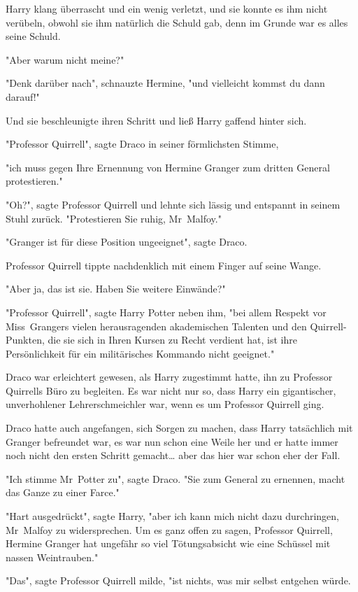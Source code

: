 {Harry klang überrascht und ein wenig verletzt, und sie konnte es ihm nicht verübeln, obwohl sie ihm natürlich die Schuld gab, denn im Grunde war es alles seine Schuld.

"Aber warum nicht meine?"

"Denk darüber nach", schnauzte Hermine, "und vielleicht kommst du dann darauf!"

Und sie beschleunigte ihren Schritt und ließ Harry gaffend hinter sich.

"Professor Quirrell", sagte Draco in seiner förmlichsten Stimme,

"ich muss gegen Ihre Ernennung von Hermine Granger zum dritten General protestieren."

"Oh?", sagte Professor Quirrell und lehnte sich lässig und entspannt in seinem Stuhl zurück. "Protestieren Sie ruhig, Mr~Malfoy."

"Granger ist für diese Position ungeeignet", sagte Draco.

Professor Quirrell tippte nachdenklich mit einem Finger auf seine Wange.

"Aber ja, das ist sie. Haben Sie weitere Einwände?"

"Professor Quirrell", sagte Harry Potter neben ihm, "bei allem Respekt vor Miss~Grangers vielen herausragenden akademischen Talenten und den Quirrell-Punkten, die sie sich in Ihren Kursen zu Recht verdient hat, ist ihre Persönlichkeit für ein militärisches Kommando nicht geeignet."

Draco war erleichtert gewesen, als Harry zugestimmt hatte, ihn zu Professor Quirrells Büro zu begleiten. Es war nicht nur so, dass Harry ein gigantischer, unverhohlener Lehrerschmeichler war, wenn es um Professor Quirrell ging.

Draco hatte auch angefangen, sich Sorgen zu machen, dass Harry tatsächlich mit Granger befreundet war, es war nun schon eine Weile her und er hatte immer noch nicht den ersten Schritt gemacht… aber das hier war schon eher der Fall.

"Ich stimme Mr~Potter zu", sagte Draco. "Sie zum General zu ernennen, macht das Ganze zu einer Farce."

"Hart ausgedrückt", sagte Harry, "aber ich kann mich nicht dazu durchringen, Mr~Malfoy zu widersprechen. Um es ganz offen zu sagen, Professor Quirrell, Hermine Granger hat ungefähr so viel Tötungsabsicht wie eine Schüssel mit nassen Weintrauben."

"Das", sagte Professor Quirrell milde, "ist nichts, was mir selbst entgehen würde.

}
